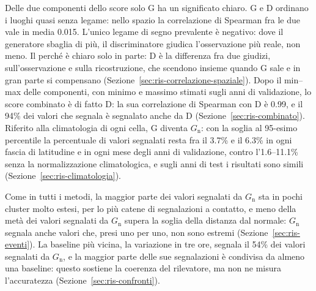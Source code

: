 Delle due componenti dello score solo G ha un significato chiaro. G e D ordinano i luoghi quasi senza legame: nello spazio la correlazione di Spearman fra le due vale in media 0.015. L'unico legame di segno prevalente è negativo: dove il generatore sbaglia di più, il discriminatore giudica l'osservazione più reale, non meno. Il perché è chiaro solo in parte: D è la differenza fra due giudizi, sull'osservazione e sulla ricostruzione, che scendono insieme quando G sale e in gran parte si compensano (Sezione~\ref{sec:ris-correlazione-spaziale}). Dopo il min--max delle componenti, con minimo e massimo stimati sugli anni di validazione, lo score combinato è di fatto D: la sua correlazione di Spearman con D è 0.99, e il 94\% dei valori che segnala è segnalato anche da D (Sezione~\ref{sec:ris-combinato}). Riferito alla climatologia di ogni cella, G diventa $G_{\mathrm{n}}$: con la soglia al 95-esimo percentile la percentuale di valori segnalati resta fra il 3.7\% e il 6.3\% in ogni fascia di latitudine e in ogni mese degli anni di validazione, contro l'1.6--11.1\% senza la normalizzazione climatologica, e sugli anni di test i risultati sono simili (Sezione~\ref{sec:ris-climatologia}).

Come in tutti i metodi, la maggior parte dei valori segnalati da $G_{\mathrm{n}}$ sta in pochi cluster molto estesi, per lo più catene di segnalazioni a contatto, e meno della metà dei valori segnalati da $G_{\mathrm{n}}$ supera la soglia della distanza dal normale: $G_{\mathrm{n}}$ segnala anche valori che, presi uno per uno, non sono estremi (Sezione~\ref{sec:ris-eventi}). La baseline più vicina, la variazione in tre ore, segnala il 54\% dei valori segnalati da $G_{\mathrm{n}}$, e la maggior parte delle sue segnalazioni è condivisa da almeno una baseline: questo sostiene la coerenza del rilevatore, ma non ne misura l'accuratezza (Sezione~\ref{sec:ris-confronti}).

